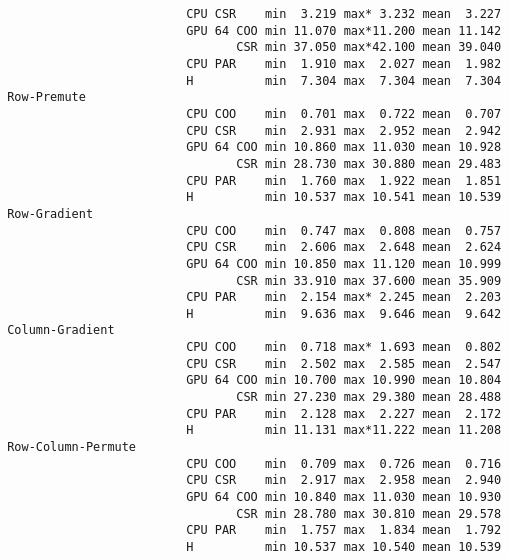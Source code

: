 \begin{verbatim}
                          CPU CSR    min  3.219 max* 3.232 mean  3.227
                          GPU 64 COO min 11.070 max*11.200 mean 11.142
                                 CSR min 37.050 max*42.100 mean 39.040
                          CPU PAR    min  1.910 max  2.027 mean  1.982
                          H          min  7.304 max  7.304 mean  7.304
 Row-Premute
                          CPU COO    min  0.701 max  0.722 mean  0.707
                          CPU CSR    min  2.931 max  2.952 mean  2.942
                          GPU 64 COO min 10.860 max 11.030 mean 10.928
                                 CSR min 28.730 max 30.880 mean 29.483
                          CPU PAR    min  1.760 max  1.922 mean  1.851
                          H          min 10.537 max 10.541 mean 10.539
 Row-Gradient
                          CPU COO    min  0.747 max  0.808 mean  0.757
                          CPU CSR    min  2.606 max  2.648 mean  2.624
                          GPU 64 COO min 10.850 max 11.120 mean 10.999
                                 CSR min 33.910 max 37.600 mean 35.909
                          CPU PAR    min  2.154 max* 2.245 mean  2.203
                          H          min  9.636 max  9.646 mean  9.642
 Column-Gradient
                          CPU COO    min  0.718 max* 1.693 mean  0.802
                          CPU CSR    min  2.502 max  2.585 mean  2.547
                          GPU 64 COO min 10.700 max 10.990 mean 10.804
                                 CSR min 27.230 max 29.380 mean 28.488
                          CPU PAR    min  2.128 max  2.227 mean  2.172
                          H          min 11.131 max*11.222 mean 11.208
 Row-Column-Permute
                          CPU COO    min  0.709 max  0.726 mean  0.716
                          CPU CSR    min  2.917 max  2.958 mean  2.940
                          GPU 64 COO min 10.840 max 11.030 mean 10.930
                                 CSR min 28.780 max 30.810 mean 29.578
                          CPU PAR    min  1.757 max  1.834 mean  1.792
                          H          min 10.537 max 10.540 mean 10.539
\end{verbatim}

